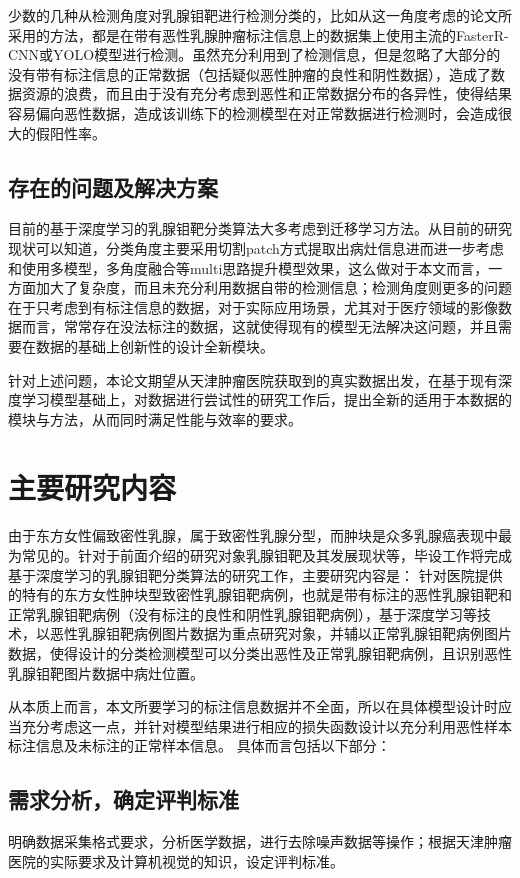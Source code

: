 少数的几种从检测角度对乳腺钼靶进行检测分类的，比如从这一角度考虑的论文\cite{28ribli2018detecting, al2017detection, 29ribli2018detecting}所采用的方法，都是在带有恶性乳腺肿瘤标注信息上的数据集上使用主流的FasterR-CNN\cite{30ren2015faster}或YOLO\cite{32redmon2016you}模型进行检测。虽然充分利用到了检测信息，但是忽略了大部分的没有带有标注信息的正常数据（包括疑似恶性肿瘤的良性和阴性数据），造成了数据资源的浪费，而且由于没有充分考虑到恶性和正常数据分布的各异性，使得结果容易偏向恶性数据，造成该训练下的检测模型在对正常数据进行检测时，会造成很大的假阳性率。

\subsection{存在的问题及解决方案}
目前的基于深度学习的乳腺钼靶分类算法大多考虑到迁移学习方法。从目前的研究现状可以知道，分类角度主要采用切割patch方式提取出病灶信息进而进一步考虑和使用多模型，多角度融合等multi思路提升模型效果，这么做对于本文而言，一方面加大了复杂度，而且未充分利用数据自带的检测信息；检测角度则更多的问题在于只考虑到有标注信息的数据，对于实际应用场景，尤其对于医疗领域的影像数据而言，常常存在没法标注的数据，这就使得现有的模型无法解决这问题，并且需要在数据的基础上创新性的设计全新模块。

针对上述问题，本论文期望从天津肿瘤医院获取到的真实数据出发，在基于现有深度学习模型基础上，对数据进行尝试性的研究工作后，提出全新的适用于本数据的模块与方法，从而同时满足性能与效率的要求。

\section{主要研究内容}
由于东方女性偏致密性乳腺，属于致密性乳腺分型，而肿块是众多乳腺癌表现中最为常见的。针对于前面介绍的研究对象乳腺钼靶及其发展现状等，毕设工作将完成基于深度学习的乳腺钼靶分类算法的研究工作，主要研究内容是：
针对医院提供的特有的东方女性肿块型致密性乳腺钼靶病例，也就是带有标注的恶性乳腺钼靶和正常乳腺钼靶病例（没有标注的良性和阴性乳腺钼靶病例），基于深度学习等技术，以恶性乳腺钼靶病例图片数据为重点研究对象，并辅以正常乳腺钼靶病例图片数据，使得设计的分类检测模型可以分类出恶性及正常乳腺钼靶病例，且识别恶性乳腺钼靶图片数据中病灶位置。

从本质上而言，本文所要学习的标注信息数据并不全面，所以在具体模型设计时应当充分考虑这一点，并针对模型结果进行相应的损失函数设计以充分利用恶性样本标注信息及未标注的正常样本信息。
具体而言包括以下部分：
\subsection{需求分析，确定评判标准}
明确数据采集格式要求，分析医学数据，进行去除噪声数据等操作；根据天津肿瘤医院的实际要求及计算机视觉的知识，设定评判标准。
